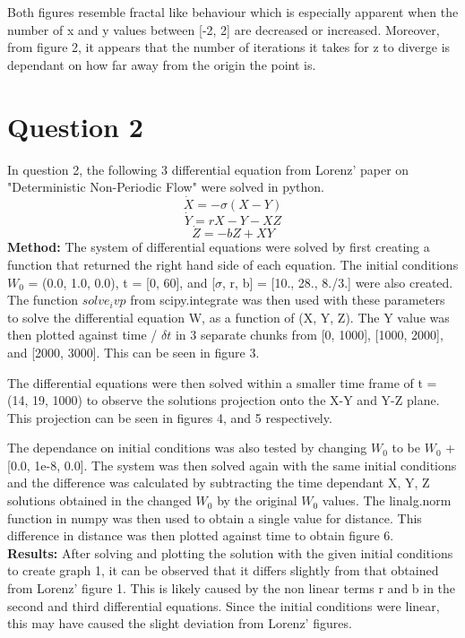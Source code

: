 \documentclass{article}
\begin{document}
Both figures resemble fractal like behaviour which is especially apparent when the number of x and y values between [-2, 2] are decreased or increased. Moreover, from figure 2, it appears that the number of iterations it takes for z to diverge is dependant on how far away from the origin the point is. 

\section{Question 2}
In question 2, the following 3 differential equation from Lorenz' paper on "Deterministic Non-Periodic Flow" were solved in python. 
$$\dot{X} = -\sigma (X - Y)$$
$$\dot{Y} = rX - Y - XZ $$
$$\dot{Z} = -bZ + XY $$
\textbf{Method:}
The system of differential equations were solved by first creating a function that returned the right hand side of each equation. The initial conditions $W_0$ = (0.0, 1.0, 0.0), t = [0, 60], and [$\sigma$, r, b] = [10., 28., 8./3.] were also created. The function $solve_ivp$ from scipy.integrate was then used with these parameters to solve the differential equation W, as a function of (X, Y, Z). The Y value was then plotted against time / $\delta t$ in 3 separate chunks from [0, 1000], [1000, 2000], and [2000, 3000]. This can be seen in figure 3.

The differential equations were then solved within a smaller time frame of t = (14, 19, 1000) to observe the solutions projection onto the X-Y and Y-Z plane. This projection can be seen in figures 4, and 5 respectively.

The dependance on initial conditions was also tested by changing $W_0$ to be $W_0$ + [0.0, 1e-8, 0.0]. The system was then solved again with the same initial conditions and the difference was calculated by subtracting the time dependant X, Y, Z solutions obtained in the changed $W_0$ by the original $W_0$ values. The linalg.norm function in numpy was then used to obtain a single value for distance. This difference in distance was then plotted against time to obtain figure 6.\\

\textbf{Results:}
After solving and plotting the solution with the given initial conditions to create graph 1, it can be observed that it differs slightly from that obtained from Lorenz' figure 1. This is likely caused by the non linear terms r and b in the second and third differential equations. Since the initial conditions were linear, this may have caused the slight deviation from Lorenz' figures. 
\end{document}
